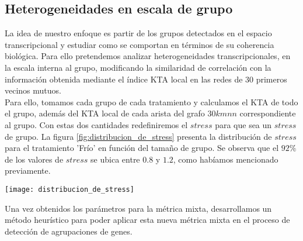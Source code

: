\subsection{Heterogeneidades en escala de grupo}
La idea de nuestro enfoque es partir de los grupos detectados en el espacio transcripcional y estudiar como se comportan en términos de su coherencia biológica. Para ello pretendemos analizar heterogeneidades transcripcionales, en la escala interna al grupo, modificando la similaridad de correlación con la información obtenida mediante el índice KTA local en las redes de 30 primeros vecinos mutuos.\\
Para ello, tomamos cada grupo de cada tratamiento y calculamos el KTA de todo el grupo, además del KTA local de cada arista del grafo $30kmnn$ correspondiente al grupo. Con estas dos cantidades redefiniremos el $stress$ para que sea un $stress$ de grupo. La figura \ref{fig:distribucion_de_stress} presenta la distribución de $stress$ para el tratamiento 'Frío' en función del tamaño de grupo. Se observa que el $92\%$ de los valores de $stress$ se ubica entre $0.8$ y $1.2$, como habíamos mencionado previamente. 
\begin{center}
\texttt{[image: distribucion\_de\_stress]}
\label{fig:distribucion_de_stress}
\end{center}
Una vez obtenidos los parámetros para la métrica mixta, desarrollamos un método heurístico para poder aplicar esta nueva métrica mixta en el proceso de detección de agrupaciones de genes.

